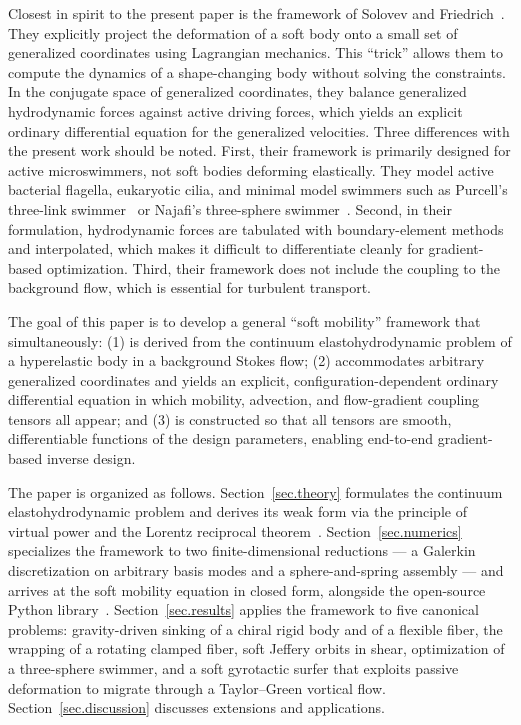 \documentclass[aps,prfluids,groupedaddress]{revtex4-2}
\begin{document}
Closest in spirit to the present paper is the framework of Solovev and Friedrich~\cite{Solovev2021}. 
They explicitly project the deformation of a soft body onto a small set of generalized coordinates using Lagrangian mechanics.
This ``trick'' allows them to compute the dynamics of a shape-changing body without solving the constraints. 
In the conjugate space of generalized coordinates, they balance generalized hydrodynamic forces against active driving forces, which yields an explicit ordinary differential equation for the generalized velocities. 
Three differences with the present work should be noted. 
First, their framework is primarily designed for active microswimmers, not soft bodies deforming elastically. They model active bacterial flagella, eukaryotic cilia, and minimal model swimmers such as Purcell's three-link swimmer~\cite{Purcell2014} or Najafi's three-sphere swimmer~\cite{Najafi2004}.
Second, in their formulation, hydrodynamic forces are tabulated with boundary-element methods and interpolated, which makes it difficult to differentiate cleanly for gradient-based optimization. 
Third, their framework does not include the coupling to the background flow, which is essential for turbulent transport.

The goal of this paper is to develop a general ``soft mobility'' framework that simultaneously: 
(1) is derived from the continuum elastohydrodynamic problem of a hyperelastic body in a background Stokes flow; 
(2) accommodates arbitrary generalized coordinates and yields an explicit, configuration-dependent ordinary differential equation in which mobility, advection, and flow-gradient coupling tensors all appear; and 
(3) is constructed so that all tensors are smooth, differentiable functions of the design parameters, enabling end-to-end gradient-based inverse design.

The paper is organized as follows.
Section~\ref{sec.theory} formulates the continuum elastohydrodynamic
problem and derives its weak form via the principle of virtual power
and the Lorentz reciprocal theorem~\cite{Happel2012}. Section~\ref{sec.numerics}
specializes the framework to two finite-dimensional reductions --- a
Galerkin discretization on arbitrary basis modes and a
sphere-and-spring assembly --- and arrives at the soft mobility
equation in closed form, alongside the open-source Python
library~\cite{softmobility}. 
Section~\ref{sec.results} applies the framework to five canonical problems: gravity-driven sinking of a chiral rigid body and of a flexible fiber, the wrapping of a rotating clamped fiber, soft Jeffery orbits in shear, optimization of a three-sphere swimmer, and a soft gyrotactic surfer that exploits passive deformation to migrate through a Taylor--Green vortical flow. Section~\ref{sec.discussion} discusses extensions and applications.
\end{document}

